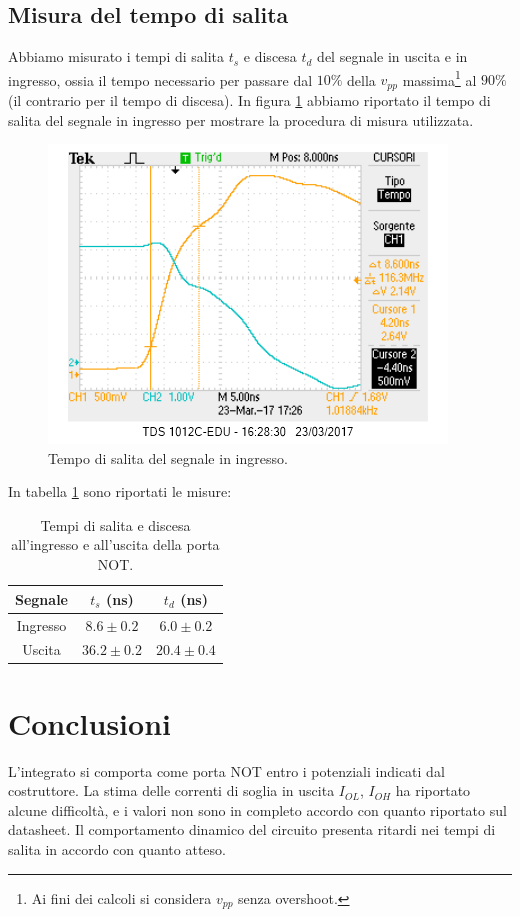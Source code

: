 \documentclass[10pt,a4paper]{article}
\begin{document}
\subsection{Misura del tempo di salita}
Abbiamo misurato i tempi di salita $t_{s}$ e discesa $t_{d}$ del segnale in uscita e in ingresso, ossia il tempo necessario per passare dal $10\%$ della $v_{pp}$ massima\footnote{Ai fini dei calcoli si considera $v_{pp}$ senza overshoot.} al $90\%$ (il contrario per il tempo di discesa).
In figura \ref{fig:tsalitain} abbiamo riportato il tempo di salita del segnale in ingresso per mostrare la procedura di misura utilizzata.
\begin{figure}
\centering
\includegraphics[scale=0.6]{tsalitain.png}
\caption{Tempo di salita del segnale in ingresso.\label{fig:tsalitain}}
\end{figure}

In tabella \ref{tab:tempisalita} sono riportati le misure:
\begin{table}
\centering
\begin{tabular}{|c|c|c|}
\hline
Segnale & $t_{s}$ (ns) & $t_{d}$ (ns) \\
\hline
Ingresso & $8.6 \pm 0.2$  & $6.0 \pm 0.2$  \\
\hline
Uscita & $36.2\pm 0.2$ &  $20.4\pm0.4$    \\
\hline

\end{tabular}
\caption{Tempi di salita e discesa all'ingresso e all'uscita della porta NOT.\label{tab:tempisalita}}
\end{table}
\section{Conclusioni}
L'integrato si comporta come porta NOT entro i potenziali indicati dal costruttore. La stima delle correnti di soglia in uscita $I_{OL}$, $I_{OH}$ ha riportato alcune difficoltà, e i valori non sono in completo accordo con quanto riportato sul datasheet.
Il comportamento dinamico del circuito presenta ritardi nei tempi di salita in accordo con quanto atteso.
\end{document}
